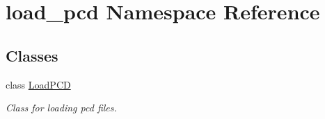 \hypertarget{namespaceload__pcd}{}\section{load\+\_\+pcd Namespace Reference}
\label{namespaceload__pcd}
\subsection*{Classes}
\begin{DoxyCompactItemize}
\item 
class \hyperlink{classload__pcd_1_1_load_p_c_d}{Load\+P\+CD}
\begin{DoxyCompactList}\small\item\em Class for loading pcd files. \end{DoxyCompactList}\end{DoxyCompactItemize}
